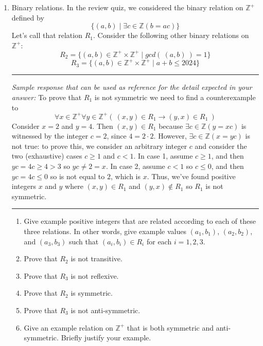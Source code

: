 \begin{enumerate}[labelindent=0pt, leftmargin=0pt]
    \item Binary relations. In the review quiz, we considered the binary relation on 
    $\mathbb{Z}^+$ defined by 
    \[\{(a,b) \mid \exists c \in \mathbb{Z}(b = ac)\}
    \]
    Let's call that relation $R_1$.
    Consider the following other binary relations on $\mathbb{Z}^{+}$:
    \[
    R_2 = \{ (a,b) \in \mathbb{Z}^+ \times \mathbb{Z}^+ \mid gcd (~ (a,b) ~) = 1\}    
    \]
    \[
    R_3 = \{ (a,b) \in \mathbb{Z}^+ \times \mathbb{Z}^+ \mid a+b \leq 2024 \}    
    \]


    \rule{0.5\textwidth}{.4pt}
    
    {\it Sample response that can be used as reference for the detail expected 
    in your answer:} 
    To prove that $R_1$ is not symmetric we need to find a counterexample 
    to 
    \[
        \forall x \in \mathbb{Z}^+ \forall y \in \mathbb{Z}^+ \left(~(x,y) \in R_1 \to (y,x) \in R_1 ~\right)
    \]
    Consider $x = 2$ and $y=4$. Then $(x,y) \in R_1$ because $\exists c \in \mathbb{Z} ( y = xc )$ is witnessed
    by the integer $c = 2$, since $4 = 2 \cdot 2$. However, $\exists c  \in \mathbb{Z} ( x = yc )$ is not
    true: to prove this, we consider an arbitrary integer $c$ and consider the two 
    (exhaustive) cases $c \geq 1$ and $c < 1$. 
    In case 1,
    assume $c \geq 1$, and then $yc = 4c \geq 4 > 3$ so $yc \neq 2 = x$. In case 2, assume $c < 1$ so $c \leq 0$,
    and then $yc = 4c \leq 0$ so is not equal to $2$, which is $x$. Thus, we've found positive integers 
    $x$ and $y$ where $(x,y) \in R_1$ and $(y,x) \notin R_1$ so $R_1$ is not symmetric.

    \rule{0.5\textwidth}{.4pt}
    


    \begin{enumerate}
        \item\gradeCompleteFirst Give example positive integers that are related
        according to each of these three relations. In other words, give 
        example values $(a_1, b_1)$, $(a_2, b_2)$, and $(a_3, b_3)$ such that
        $(a_i, b_i) \in R_i$ for each $i =1,2,3$.
        \item\gradeCorrectFirst Prove that $R_2$ is not transitive.
        \item\gradeCorrect Prove that $R_3$ is not reflexive.
        \item\gradeCorrect Prove that $R_2$ is symmetric. 
        \item\gradeCorrect Prove that $R_3$ is not anti-symmetric.
        \item\gradeComplete Give an example relation on $\mathbb{Z}^+$ that is both symmetric and anti-symmetric.
        Briefly justify your example.
        \end{enumerate}
    


\end{enumerate}
